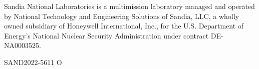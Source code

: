 \documentclass[letterpaper]{scrartcl}
\begin{document}
\vspace*{\fill}
\noindent
Sandia National Laboratories is a multimission laboratory managed and
operated by National Technology and Engineering Solutions of Sandia,
LLC, a wholly owned subsidiary of Honeywell International, Inc., for
the U.S. Department of Energy's National Nuclear Security
Administration under contract DE-NA0003525.

SAND2022-5611 O
\end{document}
